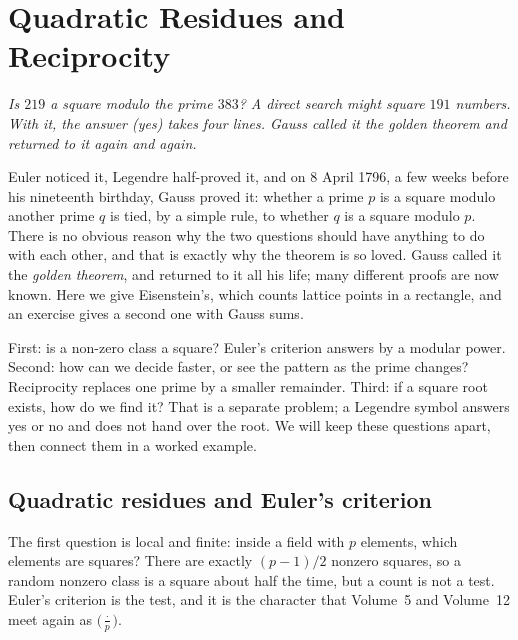 \chapter{Quadratic Residues and Reciprocity}\label{ch:reciprocity}

\begin{center}\itshape
Is $219$ a square modulo the prime $383$? A direct search might square $191$ numbers.\\
With it, the answer (yes) takes four lines. Gauss called it the \emph{golden theorem} and returned to it again and again.
\end{center}

Euler noticed it, Legendre half-proved it, and on 8 April 1796, a few weeks before his nineteenth birthday, Gauss proved it: whether a prime $p$ is a
square modulo another prime $q$ is tied, by a simple rule, to whether $q$ is a square modulo $p$. There is no obvious reason why the two questions should
have anything to do with each other, and that is exactly why the theorem is so loved. Gauss called it the \emph{golden theorem}, and returned to it all his
life; many different proofs are now known. Here we give Eisenstein's, which counts lattice points in a rectangle, and an exercise gives a second one with Gauss sums.


\begin{reminder}
First: is a non-zero class a square? Euler's criterion answers by a modular
power. Second: how can we decide faster, or see the pattern as the prime
changes? Reciprocity replaces one prime by a smaller remainder. Third: if a
square root exists, how do we find it? That is a separate problem; a Legendre
symbol answers yes or no and does not hand over the root. We will keep these
questions apart, then connect them in a worked example.
\end{reminder}

\section{Quadratic residues and Euler's criterion}

The first question is local and finite: inside a field with $p$ elements, which elements are squares? There are exactly $(p-1)/2$ nonzero squares, so a random nonzero class is a square about half the time, but a count is not a test. Euler's criterion is the test, and it is the character that Volume~5 and Volume~12 meet again as $\bigl(\frac{\cdot}{p}\bigr)$.

